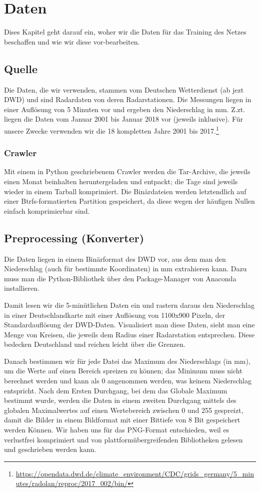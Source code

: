 \section{Daten}
Dises Kapitel geht darauf ein, woher wir die Daten für das Training des Netzes beschaffen und wie wir diese vor-bearbeiten.

\subsection{Quelle}
Die Daten, die wir verwenden, stammen vom Deutschen Wetterdienst (ab jezt DWD) und sind Radardaten von deren Radarstationen. Die Messungen liegen in einer Auflösung von 5 Minuten vor und ergeben den Niederschlag in mm. Z.zt. liegen die Daten vom Januar 2001 bis Januar 2018 vor (jeweils inklusive). Für unsere Zwecke verwenden wir die 18 kompletten Jahre 2001 bis 2017.\footnote{\url{https://opendata.dwd.de/climate\_environment/CDC/grids\_germany/5\_minutes/radolan/reproc/2017\_002/bin/}}

\subsubsection{Crawler}
Mit einem in Python geschriebenem Crawler werden die Tar-Archive, die jeweils einen Monat beinhalten heruntergeladen und entpackt; die Tage sind jeweils wieder in einem Tarball komprimiert. Die Binärdateien werden letztendlich auf einer Btrfs-formatierten Partition gespeichert, da diese wegen der häufigen Nullen einfach komprimierbar sind.

\subsection{Preprocessing (Konverter)}
Die Daten liegen in einem Binärformat des DWD vor, aus dem man den Niederschlag (auch für bestimmte Koordinaten) in mm extrahieren kann. Dazu muss man die Python-Bibliothek  über den Package-Manager von Anaconda installieren.

Damit lesen wir die 5-minütlichen Daten ein und rastern daraus den Niederschlag in einer Deutschlandkarte mit einer Auflösung von 1100x900 Pixeln, der Standardauflösung der DWD-Daten. Visualisiert man diese Daten, sieht man eine Menge von Kreisen, die jeweils dem Radius einer Radarstation entsprechen. Diese bedecken Deutschland und reichen leicht über die Grenzen.

Danach bestimmen wir für jede Datei das Maximum des Niederschlags (in mm), um die Werte auf einen Bereich spreizen zu können; das Minimum muss nicht berechnet werden und kann als 0 angenommen werden, was keinem Niederschlag entspricht.
Nach dem Ersten Durchgang, bei dem das Globale Maximum bestimmt wurde, werden die Daten in einem zweiten Durchgang mittels  des globalen Maximalwertes auf einen Wertebereich zwischen 0 und 255 gespreizt, damit die Bilder in einem Bildformat mit einer Bittiefe von 8 Bit gespeichert werden Können. Wir haben uns für das PNG-Format entschieden, weil es verlustfrei komprimiert und von plattformübergreifenden Bibliotheken gelesen und geschrieben werden kann.

